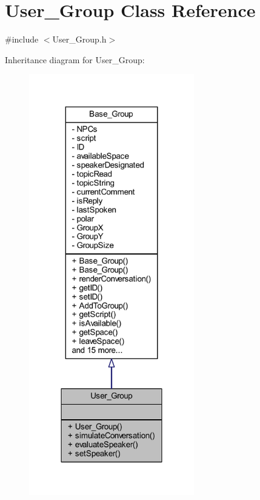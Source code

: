 \hypertarget{class_user___group}{}\section{User\+\_\+\+Group Class Reference}
\label{class_user___group}


{\ttfamily \#include $<$User\+\_\+\+Group.\+h$>$}



Inheritance diagram for User\+\_\+\+Group\+:\nopagebreak
\begin{figure}[H]
\begin{center}
\leavevmode
\includegraphics[width=204pt]{class_user___group__inherit__graph}
\end{center}
\end{figure}


